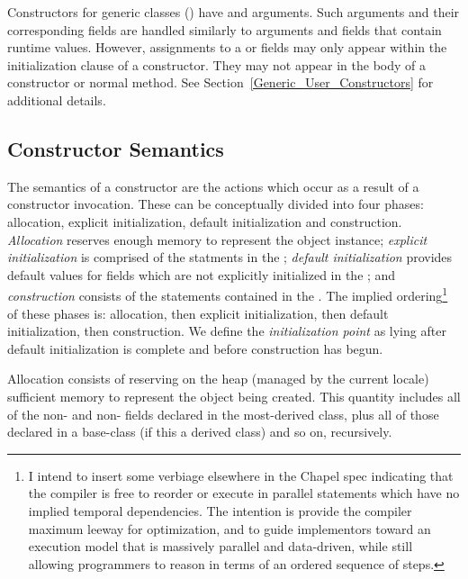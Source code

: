 Constructors for generic classes () have 
and  arguments.  Such arguments and their corresponding fields are
handled similarly to arguments and fields that contain runtime values.  However,
assignments to a  or  fields may only appear within the
initialization clause of a constructor.  They may not appear in the body of a
constructor or normal method.
See Section~\ref{Generic_User_Constructors} for additional
details.  

\subsection{Constructor Semantics}
\label{Constructor_Semantics}

The semantics of a constructor are the actions which occur as a result of a
constructor invocation.  These can be conceptually divided
into four phases: allocation, explicit initialization,
default initialization and
construction.  \emph{Allocation} reserves enough memory to represent the object
instance; \emph{explicit initialization} is comprised of the statments in
the ; \emph{default initialization} provides
default values for fields which are not explicitly initialized in
the ; and \emph{construction} consists of the
statements contained in the .  
The implied ordering\footnote{I intend to insert some verbiage elsewhere in the
Chapel spec indicating that the compiler is free to reorder or execute in
parallel statements which have no implied temporal dependencies.  The intention
is provide the compiler maximum leeway for optimization, and to guide
implementors toward an execution model that is massively parallel and
data-driven, while still allowing programmers to reason in terms of an ordered
sequence of steps.} of these phases is: allocation, then explicit
initialization, then default initialization, then construction.  We define the
\emph{initialization point} as lying after default initialization is complete and
before construction has begun.

Allocation consists of reserving on the heap (managed by the current locale)
sufficient memory to represent the object being created.  This quantity includes
all of the non- and non- fields declared in the
most-derived class, plus all of those declared in a base-class (if this
a derived class) and so on, recursively.


